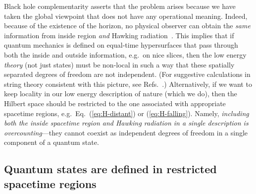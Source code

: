 \documentclass[12pt]{article}
\begin{document}
Black hole complementarity asserts that the problem arises because we 
have taken the global viewpoint that does not have any operational meaning. 
Indeed, because of the existence of the horizon, no physical observer can 
obtain the {\it same} information from inside region {\it and} Hawking 
radiation~\cite{Susskind:1993mu}.  This implies that if quantum mechanics 
is defined on equal-time hypersurfaces that pass through both the inside 
and outside information, e.g.\ on nice slices, then the low energy {\it 
theory} (not just states) must be non-local in such a way that these 
spatially separated degrees of freedom are not independent.  (For 
suggestive calculations in string theory consistent with this picture, 
see Refs.~\cite{Lowe:1995ac,Lunin:2001jy}.)  Alternatively, if we want 
to keep locality in our low energy description of nature (which we 
do), then the Hilbert space should be restricted to the one associated 
with appropriate spacetime regions, e.g.\ Eq.~(\ref{eq:H-distant}) 
or (\ref{eq:H-falling}).  Namely, {\it including both the inside 
spacetime region and Hawking radiation in a single description is 
overcounting}---they cannot coexist as independent degrees of freedom 
in a single component of a quantum state.


\subsection{Quantum states are defined in restricted spacetime regions}
\label{subsec:single-obs}
\end{document}
